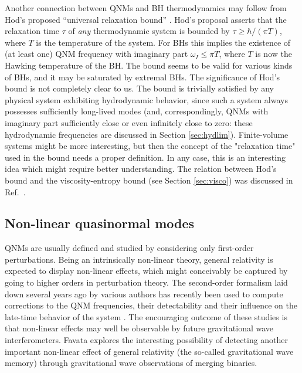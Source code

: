 \documentclass[]{iopart}
\begin{document}
Another connection between QNMs and BH thermodynamics may follow from Hod's
proposed ``universal relaxation bound''
\cite{Hod:2006jw,Hod:2007tb,Hod:2008se}.  Hod's proposal asserts that the
relaxation time $\tau$ of {\it any} thermodynamic system is bounded by $\tau
\geq \hbar/(\pi T)$, where $T$ is the temperature of the system. For BHs this
implies the existence of (at least one) QNM frequency with imaginary part
$\omega_I \leq \pi T$, where $T$ is now the Hawking temperature of the BH. The
bound seems to be valid for various kinds of BHs, and it may be saturated by
extremal BHs. The significance of Hod's bound is not completely clear to
us. The bound is trivially satisfied by any physical system exhibiting
hydrodynamic behavior, since such a system always possesses sufficiently
long-lived modes (and, correspondingly, QNMs with imaginary part sufficiently
close or even infinitely close to zero: these hydrodynamic frequencies are
discussed in Section \ref{sec:hydlim}).  Finite-volume systems might be more
interesting, but then the concept of the "relaxation time" used in the bound
needs a proper definition.  In any case, this is an interesting idea which
might require better understanding. The relation between Hod's bound and the
viscosity-entropy bound (see Section \ref{sec:visco}) was discussed in
Ref.~\cite{Hod:2009rt}.

\subsection{Non-linear quasinormal modes}

QNMs are usually defined and studied by considering only first-order
perturbations. Being an intrinsically non-linear theory, general relativity is
expected to display non-linear effects, which might conceivably be captured by
going to higher orders in perturbation theory. The second-order formalism laid
down several years ago by various authors
\cite{Gleiser:1995gx,Gleiser:1998rw,Garat:2000gp} has recently been used to
compute corrections to the QNM frequencies, their detectability and their
influence on the late-time behavior of the system
\cite{Ioka:2007ak,Nakano:2007cj,Okuzumi:2008ej}. The encouraging outcome of
these studies is that non-linear effects may well be observable by future
gravitational wave interferometers. Favata \cite{Favata:2008yd} explores the
interesting possibility of detecting another important non-linear effect of general
relativity (the so-called gravitational wave memory) through gravitational
wave observations of merging binaries.
\end{document}
